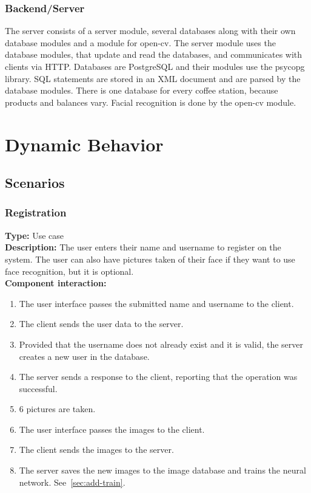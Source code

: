 \documentclass[11pt]{article}
\begin{document}
\subsubsection*{Backend/Server}
The server consists of a server module, several databases along with their own database modules and a module for open-cv. 
The server module uses the database modules, that update and read the databases, and communicates with clients via HTTP.
Databases are PostgreSQL and their modules use the psycopg library. SQL statements are stored in an XML document and are
parsed by the database modules. There is one database for every coffee station, because
products and balances vary. Facial recognition is done by the open-cv module. 

\section{Dynamic Behavior}
\subsection{Scenarios}

\subsubsection{Registration}
\textbf{Type:} Use case\\
\textbf{Description:} The user enters their name and username to register on the system.
The user can also have pictures taken of their face if they want to use face recognition,
but it is optional.\\
\textbf{Component interaction:} 
\begin{enumerate} 
\item{The user interface passes the submitted name and username to the client.}
\item{The client sends the user data to the server.}
\item{Provided that the username does not already exist and it is valid, the server creates a new user in the database.}
\item{The server sends a response to the client, reporting that the operation was successful.}
\item{6 pictures are taken.}
\item{The user interface passes the images to the client.}
\item{The client sends the images to the server.}
\item{The server saves the new images to the image database and trains the neural network. See~\ref{sec:add-train}.}
\end{enumerate}
\end{document}
